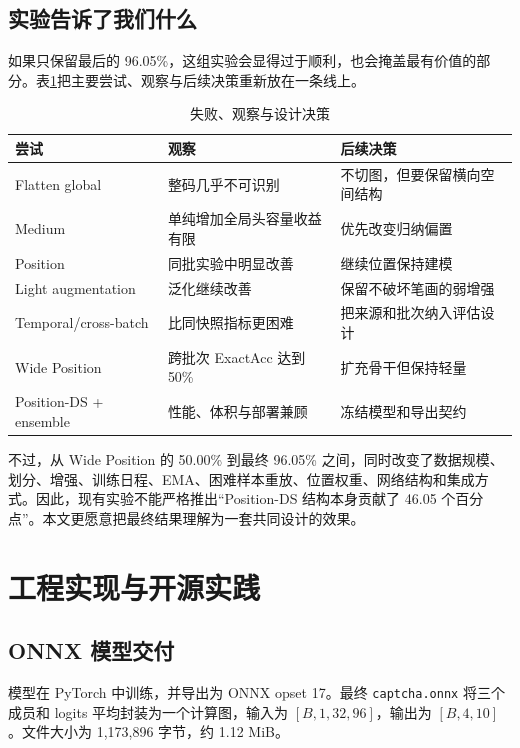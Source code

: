 \documentclass[UTF8,12pt,a4paper]{ctexart}
\begin{document}
\subsection{实验告诉了我们什么}

如果只保留最后的 96.05\%，这组实验会显得过于顺利，也会掩盖最有价值的部分。表\ref{tab:lesson}把主要尝试、观察与后续决策重新放在一条线上。

\begin{table}[htbp]
  \centering
  \caption{失败、观察与设计决策}
  \label{tab:lesson}
  \begin{tabularx}{\textwidth}{@{}lXX@{}}
    \toprule
    尝试 & 观察 & 后续决策 \\
    \midrule
    Flatten global & 整码几乎不可识别 & 不切图，但要保留横向空间结构 \\
    Medium & 单纯增加全局头容量收益有限 & 优先改变归纳偏置 \\
    Position & 同批实验中明显改善 & 继续位置保持建模 \\
    Light augmentation & 泛化继续改善 & 保留不破坏笔画的弱增强 \\
    Temporal/cross-batch & 比同快照指标更困难 & 把来源和批次纳入评估设计 \\
    Wide Position & 跨批次 ExactAcc 达到 50\% & 扩充骨干但保持轻量 \\
    Position-DS + ensemble & 性能、体积与部署兼顾 & 冻结模型和导出契约 \\
    \bottomrule
  \end{tabularx}
\end{table}

不过，从 Wide Position 的 50.00\% 到最终 96.05\% 之间，同时改变了数据规模、划分、增强、训练日程、EMA、困难样本重放、位置权重、网络结构和集成方式。因此，现有实验不能严格推出“Position-DS 结构本身贡献了 46.05 个百分点”。本文更愿意把最终结果理解为一套共同设计的效果。

\section{工程实现与开源实践}

\subsection{ONNX 模型交付}

模型在 PyTorch 中训练\cite{paszke2019pytorch}，并导出为 ONNX opset 17。最终 \texttt{captcha.onnx} 将三个成员和 logits 平均封装为一个计算图，输入为 $[B,1,32,96]$，输出为 $[B,4,10]$。文件大小为 1,173,896 字节，约 1.12 MiB。
\end{document}
